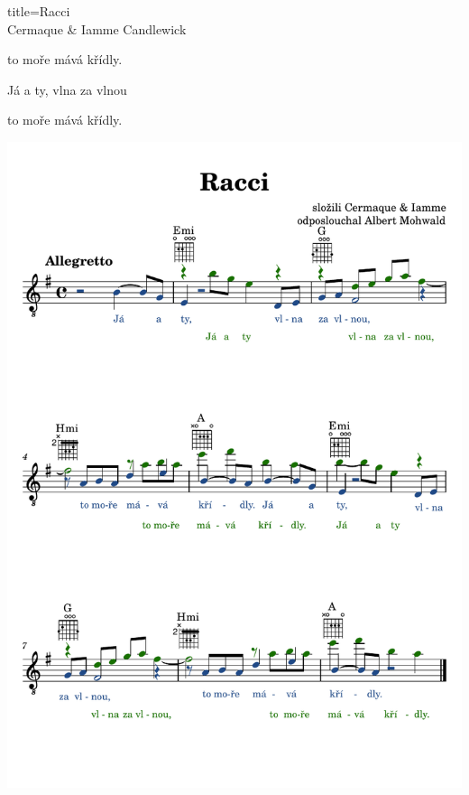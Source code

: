 \begin{song}{title=\predtitle\centering Racci\\\large Cermaque \& Iamme Candlewick  \vspace*{-0.3cm}}
\begin{centerjustified}
    to moře mává křídly.

    Já a ty, vlna za vlnou

    to moře mává křídly.
\end{centerjustified}

\newpage
\centering
\includegraphics[scale=1.1]{../taby/racci-komplet.pdf}

\setcounter{Slokočet}{0}
\end{song}

